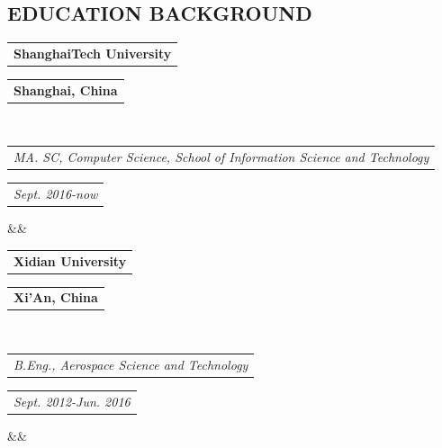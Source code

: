\documentclass[11pt,a4paper,palatine]{moderncv}        %
\makeatletter
\newcommand*{\customcventry}[7][.25em]{
  \begin{tabular}{@{}l} 
    {\bfseries #4}
  \end{tabular}
  \hfill%
  \begin{tabular}{l@{}}
     {\bfseries #5}
  \end{tabular} \\
  \begin{tabular}{@{}l} 
    {\itshape #3}
  \end{tabular}
  \hfill%
  \begin{tabular}{l@{}}
     {\itshape #2}
  \end{tabular}
  \ifx&#7&%
  \else{\\%
    \begin{minipage}{\maincolumnwidth}%
      \small#7%
    \end{minipage}}\fi%
  \par\addvspace{#1}}
\makeatother
\begin{document}
\begin{CJK*}{UTF8}{gbsn}                          %
\makecvtitle
\vspace*{-15mm}


\section{EDUCATION BACKGROUND}
{\customcventry{Sept. 2016-now}{MA. SC, Computer Science, School of Information Science and Technology}{ShanghaiTech University}{Shanghai, China}{}{}}
 
{\customcventry{ Sept. 2012-Jun. 2016}{B.Eng., Aerospace Science and Technology}{Xidian University}{Xi'An, China}{}{}}





\end{CJK*}
\end{document}
